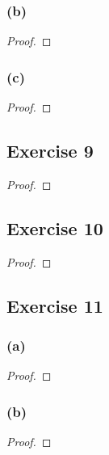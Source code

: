 \documentclass[14pt]{extarticle}
\begin{document}
\subsubsection{(b)}

\begin{proof}

\end{proof}

\subsubsection{(c)}

\begin{proof}

\end{proof}

\subsection{Exercise 9}

\begin{proof}

\end{proof}

\subsection{Exercise 10}

\begin{proof}

\end{proof}

\subsection{Exercise 11}

\subsubsection{(a)}

\begin{proof}

\end{proof}

\subsubsection{(b)}

\begin{proof}

\end{proof}
\end{document}
